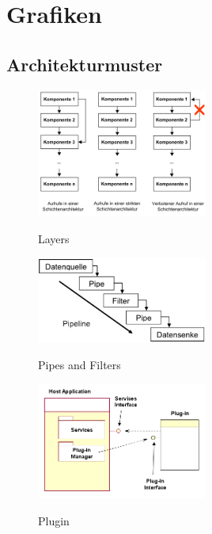 \chapter{Grafiken}
\section{Architekturmuster}
\begin{figure}[h]
	\begin{center}
		\includegraphics[width=0.5\textwidth]{images/layers}
		\label{fig:layers}
		\caption{Layers}
	\end{center}
\end{figure}

\begin{figure}[h]
	\begin{center}
		\includegraphics[width=0.5\textwidth]{images/pipes_filters}
		\label{fig:pipes_filters}
		\caption{Pipes and Filters}
	\end{center}
\end{figure}

\begin{figure}[h]
	\begin{center}
		\includegraphics[width=0.5\textwidth]{images/plugin}
		\label{fig:plugin}
		\caption{Plugin}
	\end{center}
\end{figure}

